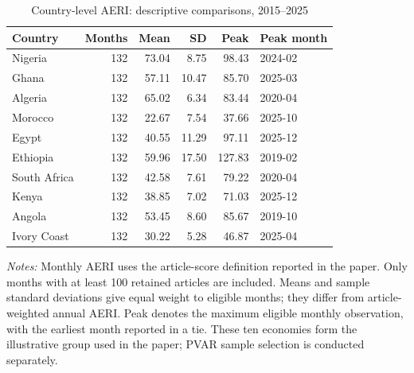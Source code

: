 \begin{table}[htbp]\centering\small\singlespacing
\caption{Country-level AERI: descriptive comparisons, 2015--2025}\label{tab:country_aeri}
\begin{tabular}{lrrrrl}\toprule
Country & Months & Mean & SD & Peak & Peak month\\\midrule
Nigeria & 132 & 73.04 & 8.75 & 98.43 & 2024-02\\
Ghana & 132 & 57.11 & 10.47 & 85.70 & 2025-03\\
Algeria & 132 & 65.02 & 6.34 & 83.44 & 2020-04\\
Morocco & 132 & 22.67 & 7.54 & 37.66 & 2025-10\\
Egypt & 132 & 40.55 & 11.29 & 97.11 & 2025-12\\
Ethiopia & 132 & 59.96 & 17.50 & 127.83 & 2019-02\\
South Africa & 132 & 42.58 & 7.61 & 79.22 & 2020-04\\
Kenya & 132 & 38.85 & 7.02 & 71.03 & 2025-12\\
Angola & 132 & 53.45 & 8.60 & 85.67 & 2019-10\\
Ivory Coast & 132 & 30.22 & 5.28 & 46.87 & 2025-04\\
\bottomrule\end{tabular}
\par\medskip\raggedright\footnotesize\textit{Notes:} Monthly AERI uses the article-score definition reported in the paper. Only months with at least 100 retained articles are included. Means and sample standard deviations give equal weight to eligible months; they differ from article-weighted annual AERI. Peak denotes the maximum eligible monthly observation, with the earliest month reported in a tie. These ten economies form the illustrative group used in the paper; PVAR sample selection is conducted separately.
\end{table}